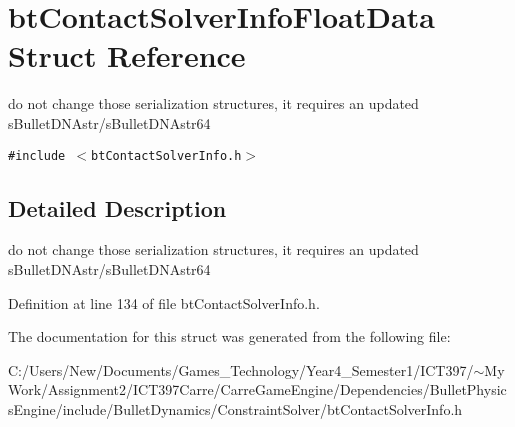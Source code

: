 \hypertarget{structbt_contact_solver_info_float_data}{
\section{btContactSolverInfoFloatData Struct Reference}
\label{structbt_contact_solver_info_float_data}
}
do not change those serialization structures, it requires an updated sBulletDNAstr/sBulletDNAstr64  


{\tt \#include $<$btContactSolverInfo.h$>$}



\subsection{Detailed Description}
do not change those serialization structures, it requires an updated sBulletDNAstr/sBulletDNAstr64 

Definition at line 134 of file btContactSolverInfo.h.

The documentation for this struct was generated from the following file:\begin{CompactItemize}
\item 
C:/Users/New/Documents/Games\_\-Technology/Year4\_\-Semester1/ICT397/$\sim$My Work/Assignment2/ICT397Carre/CarreGameEngine/Dependencies/BulletPhysicsEngine/include/BulletDynamics/ConstraintSolver/btContactSolverInfo.h\end{CompactItemize}
